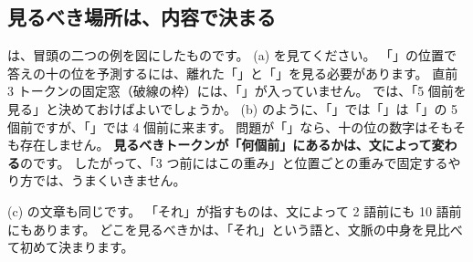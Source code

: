 \subsection*{見るべき場所は、内容で決まる}

は、冒頭の二つの例を図にしたものです。
(a) を見てください。
「\code{=}」の位置で答えの十の位を予測するには、離れた「」と「」を見る必要があります。
直前 3 トークンの固定窓（破線の枠）には、「」が入っていません。
では、「5 個前を見る」と決めておけばよいでしょうか。
(b) のように、「」では「」は「\code{=}」の 5 個前ですが、「」では 4 個前に来ます。
問題が「」なら、十の位の数字はそもそも存在しません。
\textbf{見るべきトークンが「何個前」にあるかは、文によって変わる}のです。
したがって、「3 つ前にはこの重み」と位置ごとの重みで固定するやり方では、うまくいきません。

(c) の文章も同じです。
「それ」が指すものは、文によって 2 語前にも 10 語前にもあります。
どこを見るべきかは、「それ」という語と、文脈の中身を見比べて初めて決まります。

